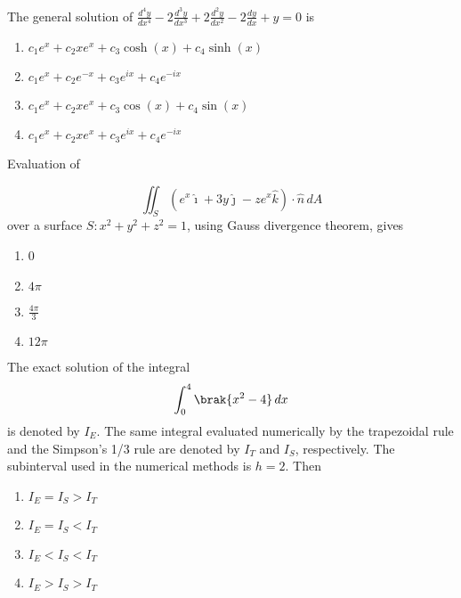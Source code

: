     \item {
    	The general solution of $
    	\frac{d^4y}{dx^4} - 2\frac{d^3y}{dx^3} + 2\frac{d^2y}{dx^2} - 2\frac{dy}{dx} + y = 0
    	$
    	is
    	\begin{multicols}{2}
	    	\begin{enumerate}
	    		\item \( c_1 e^x + c_2 xe^x + c_3 \cosh(x) + c_4 \sinh(x) \)
	    		\item \( c_1 e^x + c_2 e^{-x} + c_3 e^{ix} + c_4 e^{-ix} \)
	    		\item \( c_1 e^x + c_2 xe^x + c_3 \cos(x) + c_4 \sin(x) \)
	    		\item \( c_1 e^x + c_2 xe^x + c_3 e^{ix} + c_4 e^{-ix} \)
	    	\end{enumerate}
    	\end{multicols}
    
    }    
    \item {Evaluation of
    	
    	$$
    	\iint_S (e^x\hat{\imath} +3y\hat{\jmath} - ze^x\hat{k})\cdot \hat{n} \, dA
    	$$
    	over a surface \( S : x^2 + y^2 + z^2 = 1 \), using Gauss divergence theorem, gives
    	\begin{multicols}{4}
	    	\begin{enumerate}
	    		\item 0
	    		\item $4\pi$
	    		\item $\frac{4\pi}{3}$
	    		\item $12\pi$
	    	\end{enumerate}
    	\end{multicols}}    
    \item {The exact solution of the integral
    	$$
    	\int_0^4 \brak{x^2-4} \, dx
    	$$
    	is denoted by \( I_E \). The same integral evaluated numerically by the trapezoidal rule and the Simpson’s 1/3 rule are denoted by \( I_T \) and \( I_S \), respectively. The subinterval used in the numerical methods is \( h = 2 \). Then
        \begin{multicols}{2}
	    	\begin{enumerate}
	    		\item \( I_E = I_S > I_T \)
	    		\item \( I_E = I_S < I_T \)
	    		\item \( I_E < I_S < I_T \)
	    		\item \( I_E > I_S > I_T \)
	    	\end{enumerate}
    	\end{multicols}
	}

